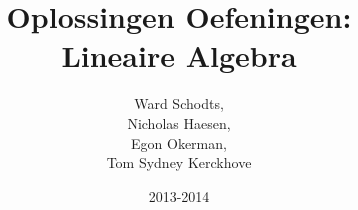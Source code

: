 \documentclass[a4paper,10pt]{article}
\title{Oplossingen Oefeningen:\\Lineaire Algebra}
\author{
Ward Schodts,\\
Nicholas Haesen,\\
Egon Okerman,\\
Tom Sydney Kerckhove}
\date{2013-2014}
\begin{document}
\begin{titlepage}
\maketitle
\end{titlepage}
\tableofcontents
\pagebreak














\end{document}
